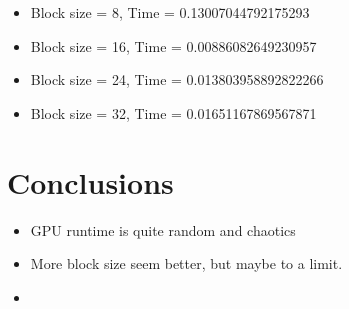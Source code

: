 \documentclass{article}
\begin{document}
\begin{itemize}
    \item Block size = 8, Time = 0.13007044792175293
    \item Block size = 16, Time = 0.00886082649230957
    \item Block size = 24, Time = 0.013803958892822266
    \item Block size = 32, Time = 0.01651167869567871
\end{itemize}

\section{Conclusions}
\begin{itemize}
    \item GPU runtime is quite random and chaotics
    \item More block size seem better, but maybe to a limit.
\end{itemize}


\begin{itemize}
    \item 
\end{itemize}
\end{document}
